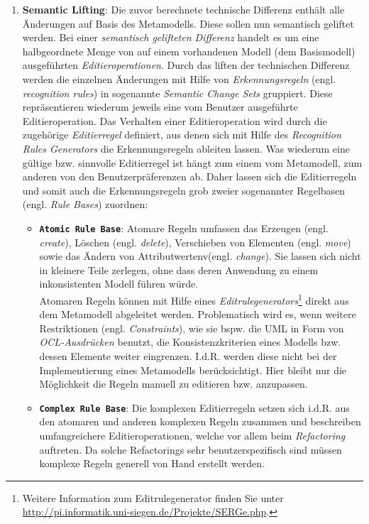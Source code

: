 \begin{enumerate}
\item \textbf{Semantic Lifting}:\label{page:semantic_change_sets}
Die zuvor berechnete technische Differenz enthält alle Än\-der\-ung\-en  auf Basis des Metamodells.
Diese sollen nun semantisch geliftet werden.
Bei einer \textit{semantisch gelifteten Differenz} handelt es um eine halbgeordnete Menge von auf einem vorhandenen Modell (dem Basismodell) ausgeführten \textit{Editieroperationen}.
Durch das liften der technischen Differenz werden die einzelnen Änderungen mit Hilfe von \textit{Erkennungsregeln} (engl. \textit{recognition rules}) in sogenannte \textit{Semantic Change Sets} gruppiert. Diese repräsentieren wiederum jeweils eine vom Benutzer ausgeführte Editieroperation.
Das Verhalten einer Editieroperation wird durch die zugehörige \textit{Editierregel} definiert, aus denen sich mit Hilfe des \textit{Recognition Rules Generators} die Erkennungsregeln ableiten lassen. 
Was wiederum eine gültige bzw. sinnvolle Editierregel ist hängt zum einem vom Metamodell, zum anderen von den Benutzerpräferenzen ab. 
Daher lassen sich die Editierregeln und somit auch die Erkennungsregeln grob zweier sogenannter Regelbasen (engl. \textit{Rule Bases}) zuordnen:

\begin{itemize}
\item \textbf{\texttt{Atomic Rule Base}}: 
Atomare Regeln umfassen das Erzeugen (engl. \textit{create}), Löschen (engl. \textit{delete}), Verschieben von Elementen (engl. \textit{move}) sowie das Ändern von Attributwertenv(engl. \textit{change}).
Sie lassen sich nicht in kleinere Teile zerlegen, ohne dass deren Anwendung zu einem inkonsistenten Modell führen würde.\\
Atomaren Regeln können mit Hilfe eines \textit{Editrulegenerators}\footnote{Weitere Information zum Editrulegenerator finden Sie unter \url{http://pi.informatik.uni-siegen.de/Projekte/SERGe.php}.} direkt aus dem Metamodell abgeleitet werden. 
Problematisch wird es, wenn weitere Restriktionen (engl. \textit{Constraints}), wie sie bspw. die UML in Form von \textit{OCL-Ausdrücken} benutzt, die Konsistenzkriterien eines Modells bzw. dessen Elemente weiter eingrenzen. 
I.d.R. werden diese nicht bei der Implementierung eines Metamodells berücksichtigt.
Hier bleibt nur die Möglichkeit die Regeln manuell zu editieren bzw. anzupassen.

\item \textbf{\texttt{Complex Rule Base}}: 
Die komplexen Editierregeln setzen sich i.d.R. aus den atomaren und anderen komplexen Regeln zusammen und beschreiben umfangreichere Editieroperationen, welche vor allem beim \textit{Refactoring} auftreten. 
Da solche Refactorings sehr benutzerspezifisch sind müssen komplexe Regeln generell von Hand erstellt werden.
\end{itemize}


\end{enumerate}
